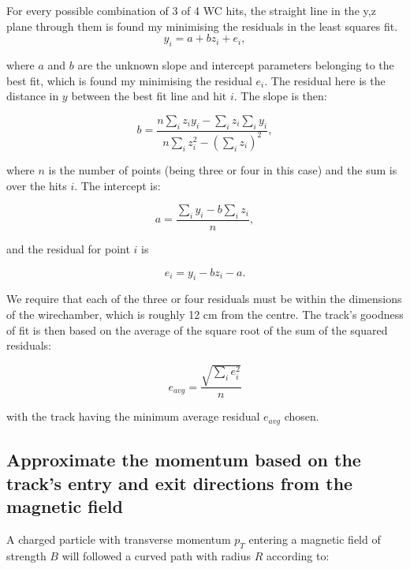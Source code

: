 For every possible combination of 3 of 4 WC hits, the straight line in the y,z plane  through them is found my minimising the residuals in the least squares fit.\\[1ex]


\begin{equation}
 y_i = a + b z_i + e_i , 
\end{equation}

where $a$ and $b$ are the unknown slope and intercept parameters belonging to the best fit, which is found my minimising the residual $e_i$. The residual here is the distance in $y$ between the best fit line and hit $i$. The slope is then:

\begin{equation}
b = \frac{  n  \sum_i z_iy_i  - \sum_i z_i  \sum_i y_i   }{   n  \sum_i  z_i^2  - (\sum_i z_i )^2 } , 
\end{equation}

where $n$ is the number of points (being three or four in this case) and the sum is over the hits $i$. The intercept is:

\begin{equation}
a = \frac{ \sum_i y_i  - b  \sum_i z_i  }{ n   },
\end{equation}

and the residual for point $i$ is 

\begin{equation}
e_i = y_i - b z_i - a.
\end{equation}

We require that each of the three or four residuals must be within the dimensions of the wirechamber, which is roughly 12 cm from the centre. The track's goodness of fit is then based on the average of the square root of the sum of the squared residuals:

\begin{equation}
e_{avg} = \frac{ \sqrt{ \sum_i e_i^2} }{ n}
\end{equation}

with the track having the minimum average residual $e_{avg}$ chosen.




\subsection{Approximate the momentum based on the track's entry and exit directions from the magnetic field}

A charged particle with transverse momentum $p_{T}$ entering a magnetic field of strength $B$ will followed a curved path with radius $R$ according to:

